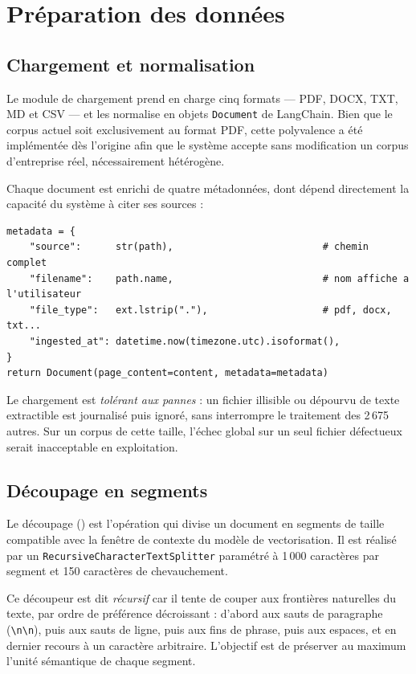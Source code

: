 \section{Préparation des données}

\subsection{Chargement et normalisation}

Le module de chargement prend en charge cinq formats --- PDF, DOCX, TXT, MD et
CSV --- et les normalise en objets \texttt{Document} de LangChain. Bien que le
corpus actuel soit exclusivement au format PDF, cette polyvalence a été
implémentée dès l'origine afin que le système accepte sans modification un
corpus d'entreprise réel, nécessairement hétérogène.

Chaque document est enrichi de quatre métadonnées, dont dépend directement la
capacité du système à citer ses sources :

\begin{lstlisting}[style=python,caption={Enrichissement en métadonnées (\texttt{src/ingestion/loader.py})}]
metadata = {
    "source":      str(path),                          # chemin complet
    "filename":    path.name,                          # nom affiche a l'utilisateur
    "file_type":   ext.lstrip("."),                    # pdf, docx, txt...
    "ingested_at": datetime.now(timezone.utc).isoformat(),
}
return Document(page_content=content, metadata=metadata)
\end{lstlisting}

Le chargement est \emph{tolérant aux pannes} : un fichier illisible ou dépourvu
de texte extractible est journalisé puis ignoré, sans interrompre le traitement
des 2\,675 autres. Sur un corpus de cette taille, l'échec global sur un seul
fichier défectueux serait inacceptable en exploitation.

\subsection{Découpage en segments}
\label{sec:chunking}

Le découpage () est l'opération qui divise un document en segments
de taille compatible avec la fenêtre de contexte du modèle de vectorisation. Il
est réalisé par un \texttt{RecursiveCharacterTextSplitter} paramétré à
1\,000 caractères par segment et 150 caractères de chevauchement.

Ce découpeur est dit \emph{récursif} car il tente de couper aux frontières
naturelles du texte, par ordre de préférence décroissant : d'abord aux sauts de
paragraphe (\texttt{\textbackslash n\textbackslash n}), puis aux sauts de ligne,
puis aux fins de phrase, puis aux espaces, et en dernier recours à un caractère
arbitraire. L'objectif est de préserver au maximum l'unité sémantique de chaque
segment.

